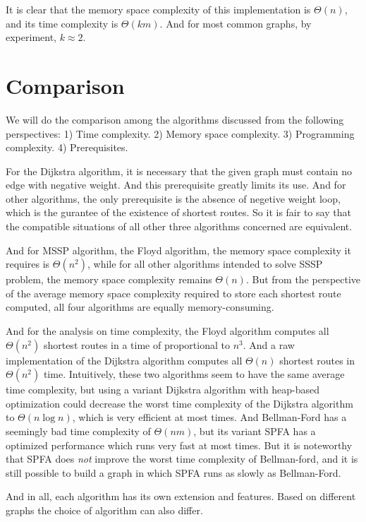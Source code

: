 \documentclass[a4paper,11pt,twocolumn]{article}
\begin{document}
It is clear that the memory space complexity of this implementation is $\Theta(n)$, and its time complexity is $\Theta(km)$. And for most common graphs, by experiment, $k\approx 2$.

\section{Comparison}

We will do the comparison among the algorithms discussed from the following perspectives: 1) Time complexity. 2) Memory space complexity. 3) Programming complexity. 4) Prerequisites.

For the Dijkstra algorithm, it is necessary that the given graph must contain no edge with negative weight. And this prerequisite greatly limits its use. And for other algorithms, the only prerequisite is the absence of negetive weight loop, which is the gurantee of the existence of shortest routes. So it is fair to say that the compatible situations of all other three algorithms concerned are equivalent.

And for MSSP algorithm, the Floyd algorithm, the memory space complexity it requires is $\Theta(n^2)$, while for all other algorithms intended to solve SSSP problem, the memory space complexity remains $\Theta(n)$. But from the perspective of the average memory space complexity required to store each shortest route computed, all four algorithms are equally memory-consuming.

And for the analysis on time complexity, the Floyd algorithm computes all $\Theta(n^2)$ shortest routes in a time of proportional to $n^3$. And a raw implementation of the Dijkstra algorithm computes all $\Theta(n)$ shortest routes in $\Theta(n^2)$ time. Intuitively, these two algorithms seem to have the same average time complexity, but using a variant Dijkstra algorithm with heap-based optimization could decrease the worst time complexity of the Dijkstra algorithm to $\Theta(n\log n)$, which is very efficient at most times. And Bellman-Ford has a seemingly bad time complexity of $\Theta(nm)$, but its variant SPFA has a optimized performance which runs very fast at most times. But it is noteworthy that SPFA does \emph{not} improve the worst time complexity of Bellman-ford, and it is still possible to build a graph in which SPFA runs as slowly as Bellman-Ford.

And in all, each algorithm has its own extension and features. Based on different graphs the choice of algorithm can also differ.
\end{document}
